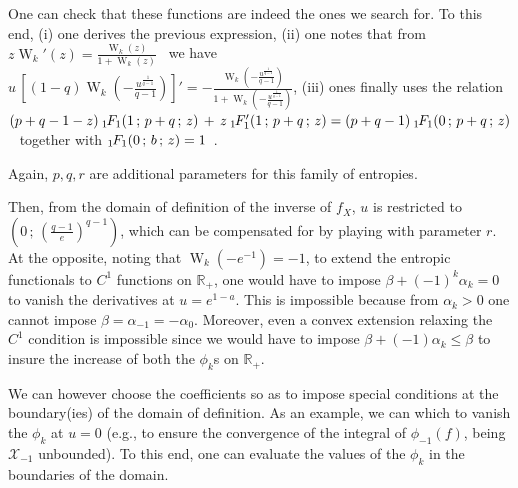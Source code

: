 \documentclass[entropy,article,submit,moreauthors,pdftex]{Definitions/mdpi}
\def\Rset{\mathbb{R}}%
\def\X{\mathcal{X}}%
\def\W{\operatorname{W}} %
\newcommand{\hypgeom}[2]{\mbox{}_{#1}\hspace{-1pt}F_{#2}}%
\begin{document}
%
One can check  that these functions are  indeed the ones we search  for. To this
end,  (i) one  derives the  previous  expression, (ii)  one notes  that from  $z
\W_k'(z) =  \frac{\W_k(z)}{1+\W_k(z)}$~\cite[Eq.~3.2]{CorGon96} we have \  $u \,
\left[  (1-q) \W_k\left(  - \frac{u^{\frac{1}{q-1}}}{q-1}  \right) \right]'  = -
\frac{\W_k\left(   -   \frac{u^{\frac{1}{q-1}}}{q-1}   \right)}{1+\W_k\left(   -
  \frac{u^{\frac{1}{q-1}}}{q-1} \right)}$, (iii) ones  finally uses the relation
$(p+q-1  - z)  \:  \hypgeom{1}{1}(1  \, ;  \,  p+q \,  ;  \, z)  \,  +  \, z  \:
\hypgeom{1}{1}'( 1 \, ; \, p+q \, ; \, z)  = (p + q - 1) \: \hypgeom{1}{1}( 0 \,
; \, p+q \,  ; \, z)$~\cite[13.4.11]{AbrSte70} together  with $\hypgeom{1}{1}( 0
\, ; \, b \, ; \, z) = 1$~\cite[13.1.2]{AbrSte70}.

Again, $p, q, r$ are additional parameters for this family of entropies.

Then, from the domain  of definition of the inverse of  $f_X$, $u$ is restricted
to $\left( 0  \, ; \, \left( \frac{q-1}{e} \right)^{q-1}  \right)$, which can be
compensated for  by playing with  parameter $r$.   At the opposite,  noting that
$\W_k\left( -e^{-1} \right)  = -1$, to extend the entropic  functionals to $C^1$
functions on $\Rset_+$, one  would have to impose $\beta +  (-1)^k \alpha_k = 0$
to vanish  the derivatives  at $u  = e^{1-a}$. This  is impossible  because from
$\alpha_k > 0$ one cannot impose  $\beta = \alpha_{-1} = - \alpha_0$.  Moreover,
even a  convex extension  relaxing the  $C^1$ condition  is impossible  since we
would have to impose $\beta + (-1) \alpha_k \le \beta$ to insure the increase of
both the $\phi_k$s on $\Rset_+$.

We can however choose the coefficients so as to impose special conditions at the
boundary(ies) of the domain of definition. As  an example, we can which to vanish
the $\phi_k$  at $u =  0$ (e.g.,  to ensure the  convergence of the  integral of
$\phi_{-1}(f)$, being $\X_{-1}$  unbounded).  To this end, one  can evaluate the
values     of     the     $\phi_k$      in     the     boundaries     of     the
domain.
\end{document}
